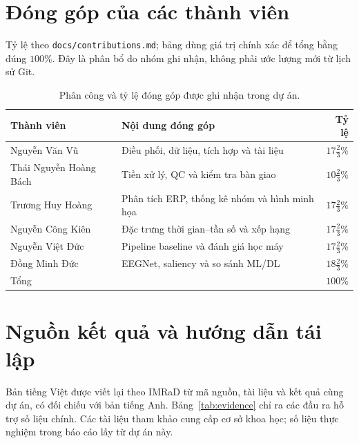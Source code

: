 \documentclass[11pt,a4paper]{article}
\newcommand{\code}[1]{\nolinkurl{#1}}
\begin{document}
\section*{Đóng góp của các thành viên}
Tỷ lệ theo \code{docs/contributions.md}; bảng dùng giá trị chính xác để tổng bằng đúng $100\%$. Đây là phân bổ do nhóm ghi nhận, không phải ước lượng mới từ lịch sử Git.

\begin{table}[htbp]
\centering\small
\caption{Phân công và tỷ lệ đóng góp được ghi nhận trong dự án.}
\begin{tabularx}{\linewidth}{lYr}
\toprule
Thành viên & Nội dung đóng góp & Tỷ lệ\\\midrule
Nguyễn Văn Vũ & Điều phối, dữ liệu, tích hợp và tài liệu & $17\frac{2}{3}\%$\\
Thái Nguyễn Hoàng Bách & Tiền xử lý, QC và kiểm tra bàn giao & $10\frac{2}{3}\%$\\
Trương Huy Hoàng & Phân tích ERP, thống kê nhóm và hình minh họa & $17\frac{2}{3}\%$\\
Nguyễn Công Kiên & Đặc trưng thời gian--tần số và xếp hạng & $17\frac{2}{3}\%$\\
Nguyễn Việt Đức & Pipeline baseline và đánh giá học máy & $17\frac{2}{3}\%$\\
Đồng Minh Đức & EEGNet, saliency và so sánh ML/DL & $18\frac{2}{3}\%$\\\midrule
Tổng & & $100\%$\\\bottomrule
\end{tabularx}
\end{table}
\FloatBarrier

\appendix
\section{Nguồn kết quả và hướng dẫn tái lập}
Bản tiếng Việt được viết lại theo IMRaD từ mã nguồn, tài liệu và kết quả cùng dự án, có đối chiếu với bản tiếng Anh. Bảng~\ref{tab:evidence} chỉ ra các đầu ra hỗ trợ số liệu chính. Các tài liệu tham khảo cung cấp cơ sở khoa học; số liệu thực nghiệm trong báo cáo lấy từ dự án này.
\end{document}
